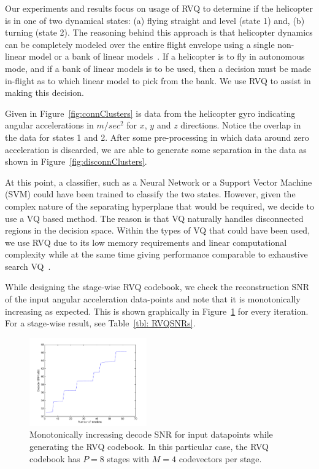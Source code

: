 \documentclass{article}
\begin{document}
Our experiments and results focus on usage of RVQ to determine if the helicopter is in one of two dynamical states: (a) flying straight and level (state 1) and, (b) turning (state 2).  The reasoning behind this approach is that helicopter dynamics can be completely modeled over the entire flight envelope using a single non-linear model or a bank of linear models~\cite{2011_BOOK_Heli_Raptis}.  If a helicopter is to fly in autonomous mode, and if a bank of linear models is to be used, then a decision must be made in-flight as to which linear model to pick from the bank.  We use RVQ to assist in making this decision.

Given in Figure~\ref{fig:connClusters} is data from the helicopter gyro indicating angular accelerations in $m/{sec}^2$ for $x$, $y$ and $z$ directions.  Notice the overlap in the data for states 1 and 2.  After some pre-processing in which data around zero acceleration is discarded, we are able to generate some separation in the data as shown in Figure~\ref{fig:disconnClusters}.

At this point, a classifier, such as a Neural Network or a Support Vector Machine (SVM) could have been trained to classify the two states.  However, given the complex nature of the separating hyperplane that would be required, we decide to use a VQ based method.  The reason is that VQ naturally handles disconnected regions in the decision space.  Within the types of VQ that could have been used, we use RVQ due to its low memory requirements and linear computational complexity while at the same time giving performance comparable to exhaustive search VQ~\cite{1996_JNL_AdvancesRVQ_Barnes}.

While designing the stage-wise RVQ codebook, we check the reconstruction SNR of the input angular acceleration data-points and note that it is monotonically increasing as expected.  This is shown graphically in Figure~\ref{fig:RVQdecSNRdB} for every iteration.   For a stage-wise result, see Table~\ref{tbl: RVQSNRs}.

\begin{figure}[t]
\centering	
\includegraphics[width=0.45\textwidth]{figs/paper_10_ICAI2013_RVQdecoderSNRdB.pdf}
\caption{Monotonically increasing decode SNR for input datapoints while generating the RVQ codebook.  In this particular case, the RVQ codebook has $P=8$ stages with $M=4$ codevectors per stage.} 
\label{fig:RVQdecSNRdB}				
\end{figure}
\end{document}
